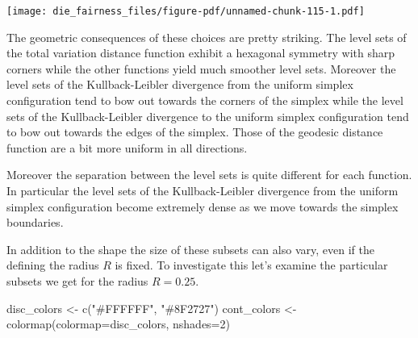 \documentclass[
  letterpaper,
  DIV=11,
  numbers=noendperiod]{scrartcl}
\newenvironment{Shaded}{\begin{snugshade}}{\end{snugshade}}
\newcommand{\AttributeTok}[1]{\textcolor[rgb]{0.40,0.45,0.13}{#1}}
\newcommand{\DecValTok}[1]{\textcolor[rgb]{0.68,0.00,0.00}{#1}}
\newcommand{\FunctionTok}[1]{\textcolor[rgb]{0.28,0.35,0.67}{#1}}
\newcommand{\NormalTok}[1]{\textcolor[rgb]{0.00,0.23,0.31}{#1}}
\newcommand{\OtherTok}[1]{\textcolor[rgb]{0.00,0.23,0.31}{#1}}
\newcommand{\StringTok}[1]{\textcolor[rgb]{0.13,0.47,0.30}{#1}}
\begin{document}
\texttt{[image: die\_fairness\_files/figure-pdf/unnamed-chunk-115-1.pdf]}

The geometric consequences of these choices are pretty striking. The
level sets of the total variation distance function exhibit a hexagonal
symmetry with sharp corners while the other functions yield much
smoother level sets. Moreover the level sets of the Kullback-Leibler
divergence from the uniform simplex configuration tend to bow out
towards the corners of the simplex while the level sets of the
Kullback-Leibler divergence to the uniform simplex configuration tend to
bow out towards the edges of the simplex. Those of the geodesic distance
function are a bit more uniform in all directions.

Moreover the separation between the level sets is quite different for
each function. In particular the level sets of the Kullback-Leibler
divergence from the uniform simplex configuration become extremely dense
as we move towards the simplex boundaries.

In addition to the shape the size of these subsets can also vary, even
if the defining the radius \(R\) is fixed. To investigate this let's
examine the particular subsets we get for the radius \(R = 0.25\).

\begin{Shaded}
\begin{Highlighting}[]
\NormalTok{disc\_colors }\OtherTok{\textless{}{-}} \FunctionTok{c}\NormalTok{(}\StringTok{"\#FFFFFF"}\NormalTok{, }\StringTok{"\#8F2727"}\NormalTok{)}
\NormalTok{cont\_colors }\OtherTok{\textless{}{-}} \FunctionTok{colormap}\NormalTok{(}\AttributeTok{colormap=}\NormalTok{disc\_colors, }\AttributeTok{nshades=}\DecValTok{2}\NormalTok{)}
\end{Highlighting}
\end{Shaded}
\end{document}
